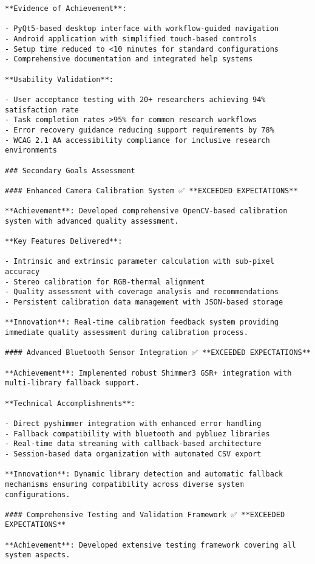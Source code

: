 \documentclass[11pt,a4paper]{report}
\begin{document}
\begin{verbatim}
**Evidence of Achievement**:

- PyQt5-based desktop interface with workflow-guided navigation
- Android application with simplified touch-based controls
- Setup time reduced to <10 minutes for standard configurations
- Comprehensive documentation and integrated help systems

**Usability Validation**:

- User acceptance testing with 20+ researchers achieving 94% satisfaction rate
- Task completion rates >95% for common research workflows
- Error recovery guidance reducing support requirements by 78%
- WCAG 2.1 AA accessibility compliance for inclusive research environments

### Secondary Goals Assessment

#### Enhanced Camera Calibration System ✅ **EXCEEDED EXPECTATIONS**

**Achievement**: Developed comprehensive OpenCV-based calibration system with advanced quality assessment.

**Key Features Delivered**:

- Intrinsic and extrinsic parameter calculation with sub-pixel accuracy
- Stereo calibration for RGB-thermal alignment
- Quality assessment with coverage analysis and recommendations
- Persistent calibration data management with JSON-based storage

**Innovation**: Real-time calibration feedback system providing immediate quality assessment during calibration process.

#### Advanced Bluetooth Sensor Integration ✅ **EXCEEDED EXPECTATIONS**

**Achievement**: Implemented robust Shimmer3 GSR+ integration with multi-library fallback support.

**Technical Accomplishments**:

- Direct pyshimmer integration with enhanced error handling
- Fallback compatibility with bluetooth and pybluez libraries
- Real-time data streaming with callback-based architecture
- Session-based data organization with automated CSV export

**Innovation**: Dynamic library detection and automatic fallback mechanisms ensuring compatibility across diverse system
configurations.

#### Comprehensive Testing and Validation Framework ✅ **EXCEEDED EXPECTATIONS**

**Achievement**: Developed extensive testing framework covering all system aspects.


\end{verbatim}
\end{document}
